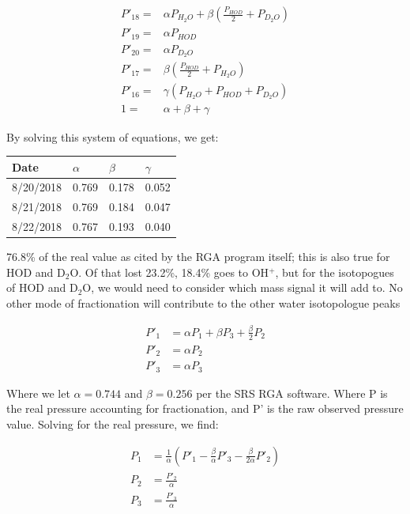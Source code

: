 \begin{align}
P'_{18} = & \alpha P_{H_2O} + \beta (\frac{P_{HOD}}{2}+P_{D_2O}) \\
P'_{19} = & \alpha P_{HOD} \\
P'_{20} = & \alpha P_{D_2O} \\
P'_{17} = & \beta (\frac{P_{HOD}}{2} + P_{H_2O}) \\
P'_{16} = & \gamma (P_{H_2O} + P_{HOD} + P_{D_2O}) \\
1 = & \alpha + \beta + \gamma
\end{align}

By solving this system of equations, we get:

\begin{table}[H]
\centering
\begin{tabular}{l|l|l|l}
Date      & $\alpha$ & $\beta$  & $\gamma$ \\ \hline
8/20/2018 & 0.769 & 0.178 & 0.052 \\ \hline
8/21/2018 & 0.769 & 0.184 & 0.047 \\ \hline
8/22/2018 & 0.767 & 0.193 & 0.040
\end{tabular}
\end{table}

76.8\% of the real value as cited by the RGA program itself; this is also true for HOD and D$_2$O. Of that lost 23.2\%, 18.4\% goes to OH$^+$, but for the isotopogues of HOD and D$_2$O, we would need to consider which mass signal it will add to. No other mode of fractionation will contribute to the other water isotopologue peaks

\begin{align}
P'_1 & = \alpha P_1 + \beta P_3 + \frac{\beta}{2} P_2 \\
P'_2 & = \alpha P_2 \\
P'_3 & = \alpha P_3
\end{align}

Where we let $\alpha = 0.744$ and $\beta=0.256$ per the SRS RGA software. Where P is the real pressure accounting for fractionation, and P' is the raw observed pressure value. Solving for the real pressure, we find:

\begin{align}
P_1 & = \frac{1}{\alpha}\left(P'_1 - \frac{\beta}{\alpha}P'_3 - \frac{\beta}{2\alpha} P'_2\right) \\
P_2 & = \frac{P'_2}{\alpha} \\
P_3 & = \frac{P'_3}{\alpha}
\end{align}

